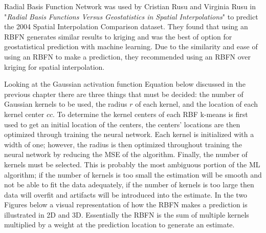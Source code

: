 \documentclass[11pt]{article}
\begin{document}
Radial Basis Function Network was used by Cristian Rusu and Virginia
Rusu in
"\textit{Radial Basis Functions Versus Geostatistics in Spatial Interpolations}"
to predict the 2004 Spatial Interpolation Comparison dataset. They found
that using an RBFN generates similar results to kriging and was the best
of option for geostatistical prediction with machine learning. Due to
the similarity and ease of using an RBFN to make a prediction, they
recommended using an RBFN over kriging for spatial interpolation.

Looking at the Gaussian activation function Equation below discussed in
the previous chapter there are three things that must be decided: the
number of Gaussian kernels to be used, the radius \(r\) of each kernel,
and the location of each kernel center \(cc\). To determine the kernel
centers of each RBF k-means is first used to get an initial location of
the centers, the centers' locations are then optimized through training
the neural network. Each kernel is initialized with a width of one;
however, the radius is then optimized throughout training the neural
network by reducing the MSE of the algorithm. Finally, the number of
kernels must be selected. This is probably the most ambiguous portion of
the ML algorithm; if the number of kernels is too small the estimation
will be smooth and not be able to fit the data adequately, if the number
of kernels is too large then data will overfit and artifacts will be
introduced into the estimate. In the two Figures below a visual
representation of how the RBFN makes a prediction is illustrated in 2D
and 3D. Essentially the RBFN is the sum of multiple kernels multiplied
by a weight at the prediction location to generate an estimate.
\end{document}
